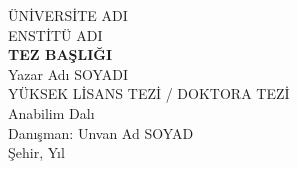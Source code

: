 \begin{titlepage}\centering
{\large ÜNİVERSİTE ADI}\\ {\large ENSTİTÜ ADI}\\[3cm]
{\LARGE\bfseries TEZ BAŞLIĞI}\\[2cm]
{\large Yazar Adı SOYADI}\\[1cm]
{\large YÜKSEK LİSANS TEZİ / DOKTORA TEZİ}\\ {\large Anabilim Dalı}\\[2cm]
{\large Danışman: Unvan Ad SOYAD}\\[1cm]
{\large Şehir, Yıl}
\end{titlepage}
